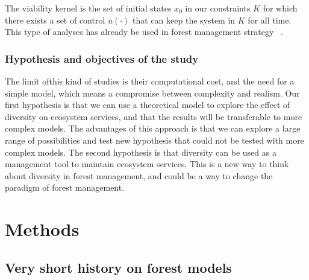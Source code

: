 \documentclass{article}
\begin{document}
The viability kernel is the set of initial states $x_0$ in our constraints $K$ for which there exists a set of control $u(\cdot)$ that can keep the system in $K$ for all time. This type of analyses has already be used in forest management strategy ~\autocite{mathiasUsingViabilityTheory2015}.

\subsubsection{Hypothesis and objectives of the study}

The limit ofthis kind of studies is their computational cost, and the need for a simple model, which means a compromise between complexity and realism. Our first hypothesis is that we can use a theoretical model to explore the effect of diversity on ecosystem services, and that the results will be transferable to more complex models. The advantages of this approach is that we can explore a large range of possibilities and test new hypothesis that could not be tested with more complex models. The second hypothesis is that diversity can be used as a management tool to maintain ecosystem services. This is a new way to think about diversity in forest management, and could be a way to change the paradigm of forest management.

\section{Methods}

\subsection{Very short history on forest models}
\end{document}
